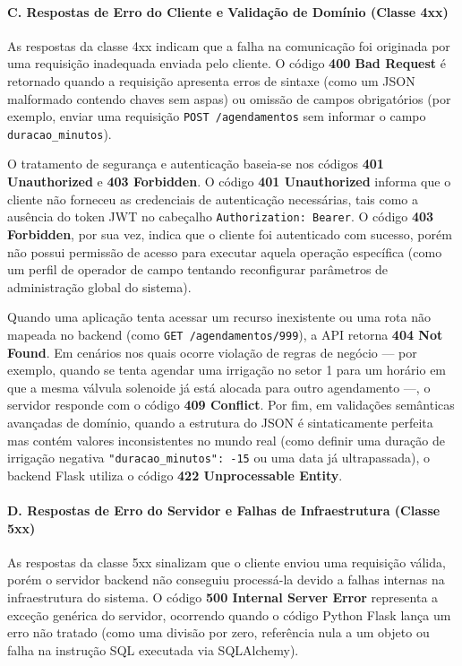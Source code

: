 \paragraph*{C. Respostas de Erro do Cliente e Validação de Domínio (Classe 4xx)}

As respostas da classe 4xx indicam que a falha na comunicação foi originada por uma requisição inadequada enviada pelo cliente. O código \textbf{400 Bad Request} é retornado quando a requisição apresenta erros de sintaxe (como um JSON malformado contendo chaves sem aspas) ou omissão de campos obrigatórios (por exemplo, enviar uma requisição \texttt{POST /agendamentos} sem informar o campo \texttt{duracao\_minutos}).

O tratamento de segurança e autenticação baseia-se nos códigos \textbf{401 Unauthorized} e \textbf{403 Forbidden}. O código \textbf{401 Unauthorized} informa que o cliente não forneceu as credenciais de autenticação necessárias, tais como a ausência do token JWT no cabeçalho \texttt{Authorization: Bearer}. O código \textbf{403 Forbidden}, por sua vez, indica que o cliente foi autenticado com sucesso, porém não possui permissão de acesso para executar aquela operação específica (como um perfil de operador de campo tentando reconfigurar parâmetros de administração global do sistema).

Quando uma aplicação tenta acessar um recurso inexistente ou uma rota não mapeada no backend (como \texttt{GET /agendamentos/999}), a API retorna \textbf{404 Not Found}. Em cenários nos quais ocorre violação de regras de negócio — por exemplo, quando se tenta agendar uma irrigação no setor 1 para um horário em que a mesma válvula solenoide já está alocada para outro agendamento —, o servidor responde com o código \textbf{409 Conflict}. Por fim, em validações semânticas avançadas de domínio, quando a estrutura do JSON é sintaticamente perfeita mas contém valores inconsistentes no mundo real (como definir uma duração de irrigação negativa \texttt{"duracao\_minutos": -15} ou uma data já ultrapassada), o backend Flask utiliza o código \textbf{422 Unprocessable Entity}.

\paragraph*{D. Respostas de Erro do Servidor e Falhas de Infraestrutura (Classe 5xx)}

As respostas da classe 5xx sinalizam que o cliente enviou uma requisição válida, porém o servidor backend não conseguiu processá-la devido a falhas internas na infraestrutura do sistema. O código \textbf{500 Internal Server Error} representa a exceção genérica do servidor, ocorrendo quando o código Python Flask lança um erro não tratado (como uma divisão por zero, referência nula a um objeto ou falha na instrução SQL executada via SQLAlchemy).

